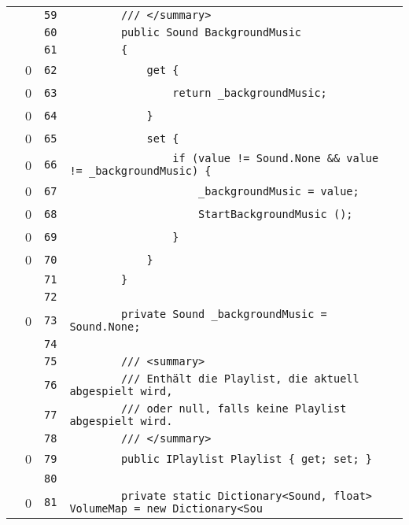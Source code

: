 \documentclass[a4paper,10pt]{article}
\begin{document}
\begin{longtable}[l]{lrrl}
\cellcolor{gray} &  & \verb~59~ & \verb~        /// </summary>~\\
\cellcolor{gray} &  & \verb~60~ & \verb~        public Sound BackgroundMusic~\\
\cellcolor{gray} &  & \verb~61~ & \verb~        {~\\
\cellcolor{red} & 0 & \verb~62~ & \verb~            get {~\\
\cellcolor{red} & 0 & \verb~63~ & \verb~                return _backgroundMusic;~\\
\cellcolor{red} & 0 & \verb~64~ & \verb~            }~\\
\cellcolor{red} & 0 & \verb~65~ & \verb~            set {~\\
\cellcolor{red} & 0 & \verb~66~ & \verb~                if (value != Sound.None && value != _backgroundMusic) {~\\
\cellcolor{red} & 0 & \verb~67~ & \verb~                    _backgroundMusic = value;~\\
\cellcolor{red} & 0 & \verb~68~ & \verb~                    StartBackgroundMusic ();~\\
\cellcolor{red} & 0 & \verb~69~ & \verb~                }~\\
\cellcolor{red} & 0 & \verb~70~ & \verb~            }~\\
\cellcolor{gray} &  & \verb~71~ & \verb~        }~\\
\cellcolor{gray} &  & \verb~72~ & \verb~~\\
\cellcolor{red} & 0 & \verb~73~ & \verb~        private Sound _backgroundMusic = Sound.None;~\\
\cellcolor{gray} &  & \verb~74~ & \verb~~\\
\cellcolor{gray} &  & \verb~75~ & \verb~        /// <summary>~\\
\cellcolor{gray} &  & \verb~76~ & \verb~        /// Enthält die Playlist, die aktuell abgespielt wird,~\\
\cellcolor{gray} &  & \verb~77~ & \verb~        /// oder null, falls keine Playlist abgespielt wird.~\\
\cellcolor{gray} &  & \verb~78~ & \verb~        /// </summary>~\\
\cellcolor{red} & 0 & \verb~79~ & \verb~        public IPlaylist Playlist { get; set; }~\\
\cellcolor{gray} &  & \verb~80~ & \verb~~\\
\cellcolor{red} & 0 & \verb~81~ & \verb~        private static Dictionary<Sound, float> VolumeMap = new Dictionary<Sou~\\

\end{longtable}
\end{document}
